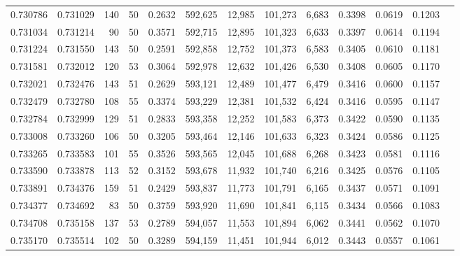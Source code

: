 \begin{tabular}{rrrrrrrrrrrrr}
0.730786 & 0.731029 &   140 &  50 &                                     0.2632 & 592,625 &  12,985 & 101,273 &   6,683 & 0.3398 & 0.0619 & 0.1203 \\
0.731034 & 0.731214 &    90 &  50 &                                     0.3571 & 592,715 &  12,895 & 101,323 &   6,633 & 0.3397 & 0.0614 & 0.1194 \\
0.731224 & 0.731550 &   143 &  50 &                                     0.2591 & 592,858 &  12,752 & 101,373 &   6,583 & 0.3405 & 0.0610 & 0.1181 \\
0.731581 & 0.732012 &   120 &  53 &                                     0.3064 & 592,978 &  12,632 & 101,426 &   6,530 & 0.3408 & 0.0605 & 0.1170 \\
0.732021 & 0.732476 &   143 &  51 &                                     0.2629 & 593,121 &  12,489 & 101,477 &   6,479 & 0.3416 & 0.0600 & 0.1157 \\
0.732479 & 0.732780 &   108 &  55 &                                     0.3374 & 593,229 &  12,381 & 101,532 &   6,424 & 0.3416 & 0.0595 & 0.1147 \\
0.732784 & 0.732999 &   129 &  51 &                                     0.2833 & 593,358 &  12,252 & 101,583 &   6,373 & 0.3422 & 0.0590 & 0.1135 \\
0.733008 & 0.733260 &   106 &  50 &                                     0.3205 & 593,464 &  12,146 & 101,633 &   6,323 & 0.3424 & 0.0586 & 0.1125 \\
0.733265 & 0.733583 &   101 &  55 &                                     0.3526 & 593,565 &  12,045 & 101,688 &   6,268 & 0.3423 & 0.0581 & 0.1116 \\
0.733590 & 0.733878 &   113 &  52 &                                     0.3152 & 593,678 &  11,932 & 101,740 &   6,216 & 0.3425 & 0.0576 & 0.1105 \\
0.733891 & 0.734376 &   159 &  51 &                                     0.2429 & 593,837 &  11,773 & 101,791 &   6,165 & 0.3437 & 0.0571 & 0.1091 \\
0.734377 & 0.734692 &    83 &  50 &                                     0.3759 & 593,920 &  11,690 & 101,841 &   6,115 & 0.3434 & 0.0566 & 0.1083 \\
0.734708 & 0.735158 &   137 &  53 &                                     0.2789 & 594,057 &  11,553 & 101,894 &   6,062 & 0.3441 & 0.0562 & 0.1070 \\
0.735170 & 0.735514 &   102 &  50 &                                     0.3289 & 594,159 &  11,451 & 101,944 &   6,012 & 0.3443 & 0.0557 & 0.1061 \\

\end{tabular}

